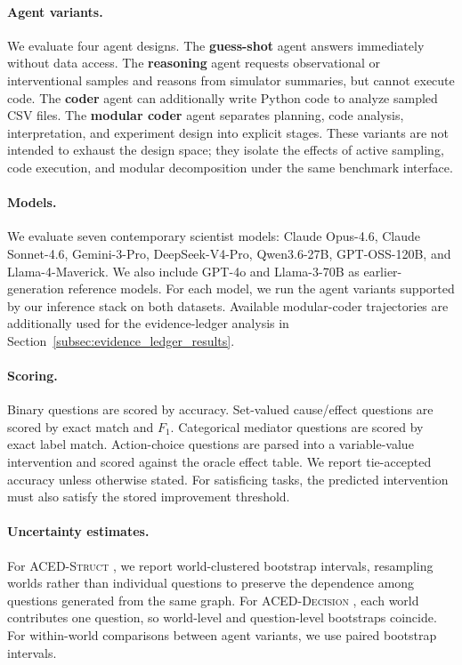 \documentclass{article}
\newcommand{\pgmstruct}{\textsc{ACED-Struct} }
\newcommand{\pgmdecision}{\textsc{ACED-Decision} }
\begin{document}
\paragraph{Agent variants.}
We evaluate four agent designs.
The \textbf{guess-shot} agent answers immediately without data access.
The \textbf{reasoning} agent requests observational or interventional samples and reasons from simulator summaries, but cannot execute code.
The \textbf{coder} agent can additionally write Python code to analyze sampled CSV files.
The \textbf{modular coder} agent separates planning, code analysis, interpretation, and experiment design into explicit stages.
These variants are not intended to exhaust the design space; they isolate the effects of active sampling, code execution, and modular decomposition under the same benchmark interface.

\paragraph{Models.}
We evaluate seven contemporary scientist models: Claude Opus-4.6, Claude Sonnet-4.6, Gemini-3-Pro, DeepSeek-V4-Pro, Qwen3.6-27B, GPT-OSS-120B, and Llama-4-Maverick.
We also include GPT-4o and Llama-3-70B as earlier-generation reference models.
For each model, we run the agent variants supported by our inference stack on both datasets.
Available modular-coder trajectories are additionally used for the evidence-ledger analysis in Section~\ref{subsec:evidence_ledger_results}.

\paragraph{Scoring.}
Binary questions are scored by accuracy.
Set-valued cause/effect questions are scored by exact match and $F_1$.
Categorical mediator questions are scored by exact label match.
Action-choice questions are parsed into a variable-value intervention and scored against the oracle effect table.
We report tie-accepted accuracy unless otherwise stated.
For satisficing tasks, the predicted intervention must also satisfy the stored improvement threshold.

\paragraph{Uncertainty estimates.}
For \pgmstruct, we report world-clustered bootstrap intervals, resampling worlds rather than individual questions to preserve the dependence among questions generated from the same graph.
For \pgmdecision, each world contributes one question, so world-level and question-level bootstraps coincide.
For within-world comparisons between agent variants, we use paired bootstrap intervals.
\end{document}
